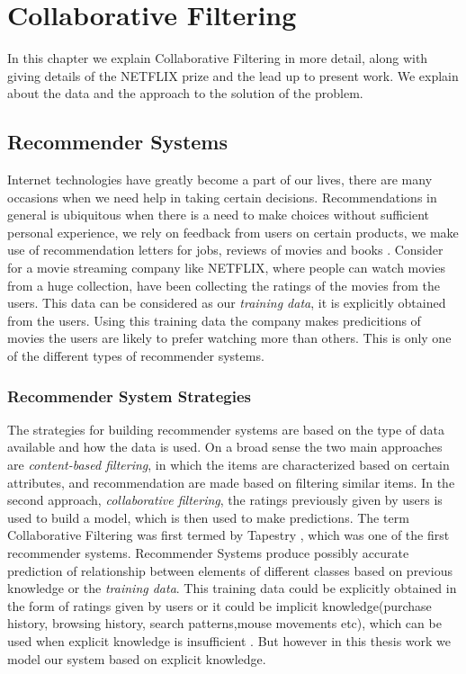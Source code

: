  \chapter{Collaborative Filtering}


\textsf{ In this chapter we explain Collaborative Filtering in more detail,
along with giving details of the NETFLIX prize and the lead up to present work.
We explain about the data and the approach to the solution of the problem.}


\section{Recommender Systems}
Internet technologies have greatly become a part of our lives, there are many
occasions when we need help in taking certain decisions. Recommendations in
general is ubiquitous when there is a need to make choices without sufficient
personal experience, we rely on feedback from users on certain products, we make
use of recommendation letters for jobs, reviews of movies and books
\cite{Resnick:1997:RS:245108.245121}. Consider for a movie streaming company
like NETFLIX, where people can watch movies from a huge collection, have been
collecting the ratings of the movies from the users. This data can be considered
as our \emph{training data}, it is explicitly obtained from the users. Using
this training data the company makes predicitions of movies the users are likely
to prefer watching more than others. This is only one of the different types of
recommender systems. 
\subsection{Recommender System Strategies}
The strategies for building recommender systems are based on the type of data
available and how the data is used. On a broad sense the two main approaches are
\emph{content-based filtering}, in which the items are characterized based on 
certain attributes, and recommendation are made based on filtering similar
items. In the second approach, \emph{collaborative filtering}, the ratings
previously given by users is used to build a model, which is then used to make
predictions. The term Collaborative Filtering was first termed by Tapestry
\cite{Goldberg:1992:UCF:138859.138867}, which was one of the first recommender
systems. Recommender
Systems produce possibly accurate prediction of relationship between elements of
different classes based on previous knowledge or the \emph{training data}. This
training data could be explicitly obtained in the form of ratings given by
users or it could be implicit knowledge(purchase
history, browsing history, search patterns,mouse movements etc), which can be
used when explicit knowledge is insufficient \cite{Hu:2008:CFI:1510528.1511352}.
But however in this thesis work we model our system based on explicit
knowledge. 

